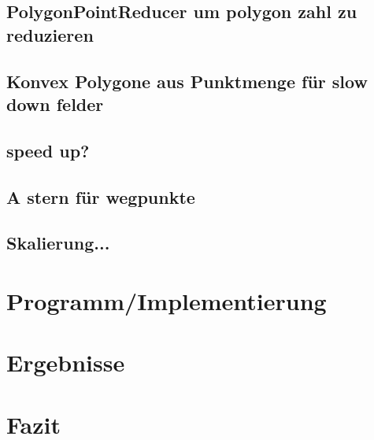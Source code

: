 \documentclass[10pt,a4paper]{article}
\begin{document}
\subsection{PolygonPointReducer um polygon zahl zu reduzieren}

\subsection{Konvex Polygone aus Punktmenge für slow down felder}

\subsection{speed up?}

\subsection{A stern für wegpunkte}

\subsection{Skalierung...}


\section{Programm/Implementierung}

\section{Ergebnisse}

\section{Fazit}

\end{document}
